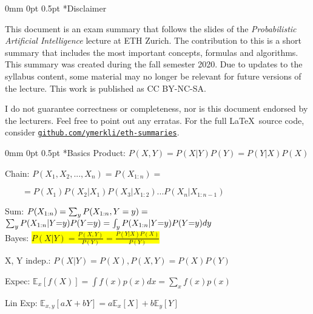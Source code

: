 \documentclass[11pt,landscape,a4paper,fleqn]{article}
\makeatletter
\renewcommand{\section}{\@startsection{section}{1}%
								{0mm}%
                                {0pt}%
                                {0.5pt}%
                                {\color{myorange}\sffamily\small\bfseries}}
\newcommand{\mhl}[1]{\setlength{\fboxsep}{0pt}\colorbox{yellow}{#1}}
\newcommand{\myeq}{\hspace*{-1mm}=\hspace*{-1mm}}
\makeatother
\begin{document}
	
\section*{Disclaimer}

\small
\begin{multicols*}{4}
	
This document is an exam summary that follows the slides of the \textit{Probabilistic Artificial Intelligence} lecture  at ETH Zurich. The contribution to this is a short summary that includes the most important concepts, formulas and algorithms. This summary was created during the fall semester 2020. Due to updates to the syllabus content, some material may no longer be relevant for future versions of the lecture. This work is published as CC BY-NC-SA.

\begin{center}
	\ccbyncsa
\end{center}

I do not guarantee correctness or completeness, nor is this document endorsed by the lecturers. Feel free to point out any erratas. For the full \LaTeX \ source code, consider \texttt{\href{https://github.com/ymerkli/eth-summaries}{github.com/ymerkli/eth-summaries}}.

\newpage

\section*{Basics}
Product: $P(X,Y)=P(X|Y)P(Y)=P(Y|X)P(X)$

Chain: $P(X_1, X_2, ..., X_n) = P(X_{1:n}) =$

$\qquad = P(X_1)P(X_2|X_1)P(X_3|X_{1:2})...P(X_n|X_{1:n-1})$

Sum: $P(X_{1:n}) = \sum_y P(X_{1:n}, Y=y) = \\$
\mbox{\fontsize{9.8}{6}\selectfont $\sum_y P(X_{1:n}|Y\myeq y)P(Y\myeq y) = \int_y P(X_{1:n}|Y\myeq y)P(Y\myeq y)dy$}\\
Bayes: \mhl{$P(X|Y) = \frac{P(X,Y)}{P(Y)} = \frac{P(Y|X)P(X)}{P(Y)}$}

X, Y indep.: $P(X|Y) = P(X), P(X,Y) = P(X) P(Y)$

Expec: $\mathbb{E}_x[f(X)] = \int f(x)p(x)dx = \sum_x f(x)p(x)$

Lin Exp: $\mathbb{E}_{x,y}[aX + bY] = a\mathbb{E}_x[X] + b \mathbb{E}_y[Y]$


\end{multicols*}
\end{document}
